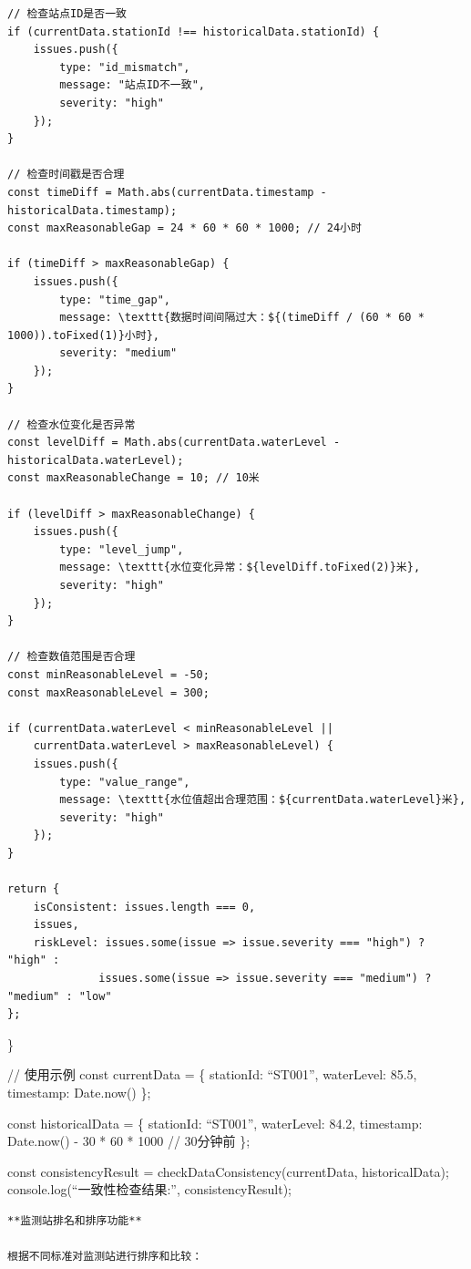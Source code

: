 \begin{verbatim}
// 检查站点ID是否一致
if (currentData.stationId !== historicalData.stationId) {
    issues.push({
        type: "id_mismatch",
        message: "站点ID不一致",
        severity: "high"
    });
}

// 检查时间戳是否合理
const timeDiff = Math.abs(currentData.timestamp - historicalData.timestamp);
const maxReasonableGap = 24 * 60 * 60 * 1000; // 24小时

if (timeDiff > maxReasonableGap) {
    issues.push({
        type: "time_gap",
        message: \texttt{数据时间间隔过大：${(timeDiff / (60 * 60 * 1000)).toFixed(1)}小时},
        severity: "medium"
    });
}

// 检查水位变化是否异常
const levelDiff = Math.abs(currentData.waterLevel - historicalData.waterLevel);
const maxReasonableChange = 10; // 10米

if (levelDiff > maxReasonableChange) {
    issues.push({
        type: "level_jump",
        message: \texttt{水位变化异常：${levelDiff.toFixed(2)}米},
        severity: "high"
    });
}

// 检查数值范围是否合理
const minReasonableLevel = -50;
const maxReasonableLevel = 300;

if (currentData.waterLevel < minReasonableLevel || 
    currentData.waterLevel > maxReasonableLevel) {
    issues.push({
        type: "value_range",
        message: \texttt{水位值超出合理范围：${currentData.waterLevel}米},
        severity: "high"
    });
}

return {
    isConsistent: issues.length === 0,
    issues,
    riskLevel: issues.some(issue => issue.severity === "high") ? "high" : 
              issues.some(issue => issue.severity === "medium") ? "medium" : "low"
};
\end{verbatim}

\}

// 使用示例 const currentData = \{ stationId: ``ST001'', waterLevel: 85.5, timestamp: Date.now() \};

const historicalData = \{ stationId: ``ST001'', waterLevel: 84.2, timestamp: Date.now() - 30 * 60 * 1000 // 30分钟前 \};

const consistencyResult = checkDataConsistency(currentData, historicalData); console.log(``一致性检查结果:'', consistencyResult);

\begin{lstlisting}
**监测站排名和排序功能**

根据不同标准对监测站进行排序和比较：
\end{lstlisting}

